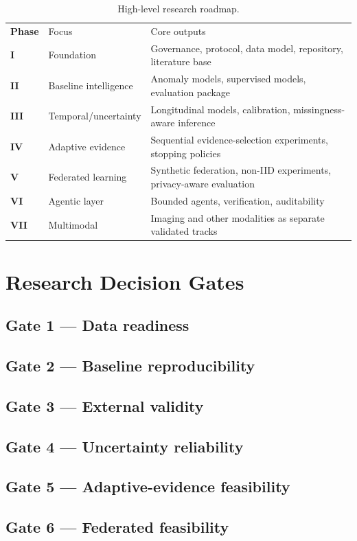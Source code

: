 \documentclass[11pt,journal,onecolumn,draftclsnofoot]{IEEEtran}
\begin{document}
\begin{table}[H]
\centering
\caption{High-level research roadmap.}
\label{tab:roadmap}
\begin{tabularx}{\textwidth}{@{}>{\bfseries}p{}p{}X@{}}
Phase & Focus & Core outputs \\
I & Foundation & Governance, protocol, data model, repository, literature base \\
II & Baseline intelligence & Anomaly models, supervised models, evaluation package \\
III & Temporal/uncertainty & Longitudinal models, calibration, missingness-aware inference \\
IV & Adaptive evidence & Sequential evidence-selection experiments, stopping policies \\
V & Federated learning & Synthetic federation, non-IID experiments, privacy-aware evaluation \\
VI & Agentic layer & Bounded agents, verification, auditability \\
VII & Multimodal & Imaging and other modalities as separate validated tracks \\
\end{tabularx}
\end{table}

\section{Research Decision Gates}
\subsection{Gate 1 --- Data readiness}
\subsection{Gate 2 --- Baseline reproducibility}
\subsection{Gate 3 --- External validity}
\subsection{Gate 4 --- Uncertainty reliability}
\subsection{Gate 5 --- Adaptive-evidence feasibility}
\subsection{Gate 6 --- Federated feasibility}
\end{document}
